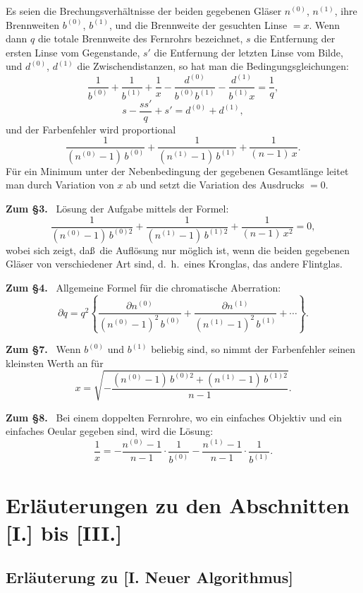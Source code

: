 \documentclass[12pt,a4paper]{article}
\theoremstyle{plain}
\theoremstyle{definition}
\theoremstyle{remark}
\begin{document}
Es seien die Brechungsverh\"altnisse der beiden gegebenen Gl\"aser
$n^{(0)}$, $n^{(1)}$, ihre Brennweiten $b^{(0)}$, $b^{(1)}$, und die
Brennweite der gesuchten Linse $= x$. Wenn dann $q$ die totale
Brennweite des Fernrohrs bezeichnet, $s$ die Entfernung der ersten
Linse vom Gegenstande, $s'$ die Entfernung der letzten Linse vom
Bilde, und $d^{(0)}$, $d^{(1)}$ die Zwischendistanzen, so hat man die
Bedingungsgleichungen:
\[
\frac{1}{b^{(0)}} + \frac{1}{b^{(1)}} + \frac{1}{x}
- \frac{d^{(0)}}{b^{(0)}b^{(1)}} - \frac{d^{(1)}}{b^{(1)}x} =
\frac{1}{q},
\]
\[
s - \frac{ss'}{q} + s' = d^{(0)} + d^{(1)},
\]
und der Farbenfehler wird proportional
\[
\frac{1}{(n^{(0)}-1)\,b^{(0)}} + \frac{1}{(n^{(1)}-1)\,b^{(1)}}
+ \frac{1}{(n-1)\,x}.
\]
F\"ur ein Minimum unter der Nebenbedingung der gegebenen Gesamtl\"ange
leitet man durch Variation von $x$ ab und setzt die Variation des
Ausdrucks $= 0$.

\textbf{Zum \S 3.} \ L\"osung der Aufgabe mittels der Formel:
\[
\frac{1}{(n^{(0)}-1)\,b^{(0)2}}
+ \frac{1}{(n^{(1)}-1)\,b^{(1)2}}
+ \frac{1}{(n-1)\,x^{2}} = 0,
\]
wobei sich zeigt, da\ss\ die Aufl\"osung nur m\"oglich ist, wenn die
beiden gegebenen Gl\"aser von verschiedener Art sind, d.~h.~eines
Kronglas, das andere Flintglas.

\textbf{Zum \S 4.} \ Allgemeine Formel f\"ur die chromatische
Aberration:
\[
\partial q = q^{2}\left\{
\frac{\partial n^{(0)}}{(n^{(0)}-1)^{2}\,b^{(0)}}
+ \frac{\partial n^{(1)}}{(n^{(1)}-1)^{2}\,b^{(1)}}
+ \cdots
\right\}.
\]

\textbf{Zum \S 7.} \ Wenn $b^{(0)}$ und $b^{(1)}$ beliebig sind, so
nimmt der Farbenfehler seinen kleinsten Werth an f\"ur
\[
x = \sqrt{-\frac{(n^{(0)}-1)\,b^{(0)2} + (n^{(1)}-1)\,b^{(1)2}}{n-1}}.
\]

\textbf{Zum \S 8.} \ Bei einem doppelten Fernrohre, wo ein einfaches
Objektiv und ein einfaches Oeular gegeben sind, wird die L\"osung:
\[
\frac{1}{x} = -\frac{n^{(0)}-1}{n-1}\cdot\frac{1}{b^{(0)}}
- \frac{n^{(1)}-1}{n-1}\cdot\frac{1}{b^{(1)}}.
\]


\newpage
\section*{Erl\"auterungen zu den Abschnitten [I.] bis [III.]}

\subsection*{Erl\"auterung zu [I. Neuer Algorithmus]}
\end{document}
